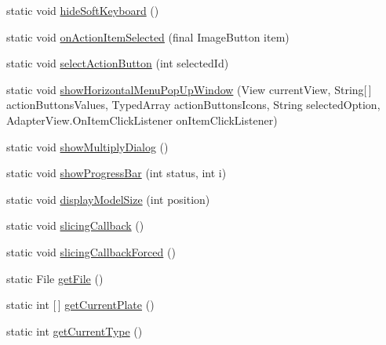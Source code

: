 \begin{DoxyCompactItemize}
\item 
static void \hyperlink{classandroid_1_1app_1_1printerapp_1_1viewer_1_1_viewer_main_fragment_aed2c32e1f1a5642d6230bb19e87f71b2}{hide\+Soft\+Keyboard} ()
\item 
static void \hyperlink{classandroid_1_1app_1_1printerapp_1_1viewer_1_1_viewer_main_fragment_af4f201e91b25487944f1f48168a1ba0e}{on\+Action\+Item\+Selected} (final Image\+Button item)
\item 
static void \hyperlink{classandroid_1_1app_1_1printerapp_1_1viewer_1_1_viewer_main_fragment_af1e22d46114ca3157f476b807f414f59}{select\+Action\+Button} (int selected\+Id)
\item 
static void \hyperlink{classandroid_1_1app_1_1printerapp_1_1viewer_1_1_viewer_main_fragment_a45fa0c79d64ab9f3b01237b558ed19ef}{show\+Horizontal\+Menu\+Pop\+Up\+Window} (View current\+View, String\mbox{[}$\,$\mbox{]} action\+Buttons\+Values, Typed\+Array action\+Buttons\+Icons, String selected\+Option, Adapter\+View.\+On\+Item\+Click\+Listener on\+Item\+Click\+Listener)
\item 
static void \hyperlink{classandroid_1_1app_1_1printerapp_1_1viewer_1_1_viewer_main_fragment_a04de3265bbfcb39b4af9bd41ff62a888}{show\+Multiply\+Dialog} ()
\item 
static void \hyperlink{classandroid_1_1app_1_1printerapp_1_1viewer_1_1_viewer_main_fragment_a52f16ff69f6d64fb40c309f0df7eb734}{show\+Progress\+Bar} (int status, int i)
\item 
static void \hyperlink{classandroid_1_1app_1_1printerapp_1_1viewer_1_1_viewer_main_fragment_ab954684fa7fedb7a11e19f0068638b04}{display\+Model\+Size} (int position)
\item 
static void \hyperlink{classandroid_1_1app_1_1printerapp_1_1viewer_1_1_viewer_main_fragment_a1ccb1201bac3b23e036b80283b4ff260}{slicing\+Callback} ()
\item 
static void \hyperlink{classandroid_1_1app_1_1printerapp_1_1viewer_1_1_viewer_main_fragment_a6ecf307c04533debafc7d45a369b962a}{slicing\+Callback\+Forced} ()
\item 
static File \hyperlink{classandroid_1_1app_1_1printerapp_1_1viewer_1_1_viewer_main_fragment_a5fd9d7bb37f3d955665c7379475d71c0}{get\+File} ()
\item 
static int \mbox{[}$\,$\mbox{]} \hyperlink{classandroid_1_1app_1_1printerapp_1_1viewer_1_1_viewer_main_fragment_ac424394d471f7598b0a7edbef934f9f6}{get\+Current\+Plate} ()
\item 
static int \hyperlink{classandroid_1_1app_1_1printerapp_1_1viewer_1_1_viewer_main_fragment_a05cb6772f0980cdf1b40d74af35814ca}{get\+Current\+Type} ()

\end{DoxyCompactItemize}
